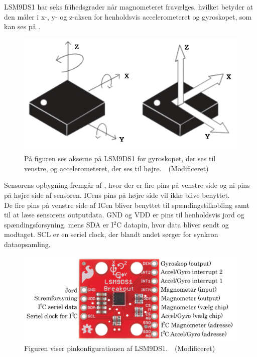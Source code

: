 LSM9DS1 har seks frihedsgrader når magnometeret fravælges, hvilket betyder at den måler i x-, y- og z-aksen for henholdsvis accelerometeret og gyroskopet, som kan ses på .~\citep{STMicroelectronics2016}\newline 
\begin{figure}[H]
	\centering
	\includegraphics[scale=0.4]{figures/cDesign/LSM9DS1.png}
	\caption{På figuren ses akserne på LSM9DS1 for gyroskopet, der ses til venstre, og accelerometeret, der ses til højre.~\citep{Jimb02016}~(Modificeret)}
	\label{vores_IC}
\end{figure}\vspace{-0.25cm}
Sensorens opbygning fremgår af , hvor der er fire pins på venstre side og ni pins på højre side af sensoren. ICens pins på højre side vil ikke blive benyttet.\\
De fire pins på venstre side af ICen bliver benyttet til spændingstilkobling samt til at læse sensorens outputdata. GND og VDD er pins til henholdsvis jord og spændingsforsyning, mens SDA er I$^2$C datapin, hvor data bliver sendt og modtaget. SCL er en seriel clock, der blandt andet sørger for synkron dataopsamling.
\begin{figure}[H]
	\centering
	\includegraphics[scale=0.23]{figures/cDesign/accelerometeret.png}
	\caption{Figuren viser pinkonfigurationen af LSM9DS1.~\citep{Jimb02016}~(Modificeret)}
	\label{fig:IC_pins}
\end{figure}\vspace{-0.25cm}
